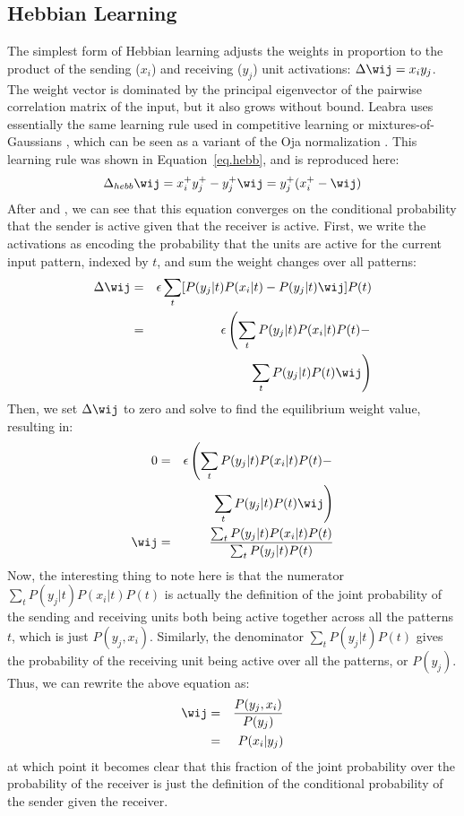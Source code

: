 \documentclass[12pt,twoside]{article}
\begin{document}
\subsection{Hebbian Learning} 

The simplest form of Hebbian learning adjusts the weights in
proportion to the product of the sending ($x_i$) and receiving ($y_j$)
unit activations: $\Delta \wij = x_i y_j$.  The weight vector is
dominated by the principal eigenvector of the pairwise correlation
matrix of the input, but it also grows without bound.  Leabra uses
essentially the same learning rule used in competitive learning or
mixtures-of-Gaussians \cite{RumelhartZipser86,Nowlan90}, which can be
seen as a variant of the Oja normalization \cite{Oja82}.  This
learning rule was shown in Equation~\ref{eq.hebb}, and is reproduced
here:
\begin{equation}
  \Delta_{hebb} \wij = x^+_i y^+_j - y^+_j \wij = y^+_j (x^+_i - \wij)
\end{equation}
After  and , we
can see that this equation converges on the conditional probability
that the sender is active given that the receiver is active.  First,
we write the activations as encoding the probability that the units
are active for the current input pattern, indexed by $t$, and sum the
weight changes over all patterns:
\begin{eqnarray}
  \Delta \wij & = & \epsilon \sum_t [P(y_j | t) P(x_i | t) -
  P(y_j | t) \wij] P(t) \nonumber \\
  & = & \epsilon \left( \sum_t P(y_j | t) P(x_i | t) P(t) - \right. \nonumber \\
  && \left. \sum_t P(y_j | t) P(t) \wij \right)
\end{eqnarray}
Then, we set $\Delta \wij$ to zero and solve to find the equilibrium weight
value, resulting in:
\begin{eqnarray}
  0 & = & \epsilon \left( \sum_t P(y_j | t) P(x_i | t) P(t) -
    \right. \nonumber \\
    && \left. \sum_t P(y_j | t) P(t) \wij \right) \nonumber \\
  \wij & = & \frac{\sum_t P(y_j | t) P(x_i | t) P(t)}
    {\sum_t P(y_j | t) P(t)}
\end{eqnarray}
Now, the interesting thing to note here is that the numerator $\sum_t
P(y_j | t) P(x_i | t) P(t)$ is actually the definition of the
joint probability of the sending and receiving units both being active
together across all the patterns $t$, which is just $P(y_j, x_i)$.
Similarly, the denominator $\sum_t P(y_j | t) P(t)$ gives the
probability of the receiving unit being active over all the patterns,
or $P(y_j)$.  Thus, we can rewrite the above equation as:
\begin{eqnarray}
  \wij & = & \frac{P(y_j, x_i)}{P(y_j)} \nonumber \\
  & = & P(x_i | y_j)
\end{eqnarray}
at which point it becomes clear that this fraction of the joint
probability over the probability of the receiver is just the
definition of the conditional probability of the sender given the
receiver. 
\end{document}
